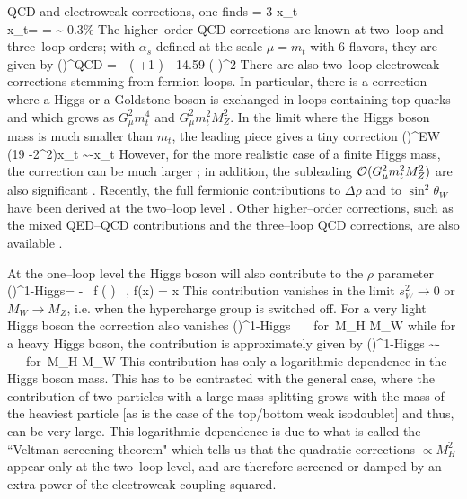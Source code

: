 QCD and electroweak corrections, one finds   
\beq 
\Delta \rho = 3 x_t  \label{deltarho} \\
x_t=  =  \sim 
0.3\%
\label{define:xt} 
\eeq
The higher--order QCD corrections are known at two--loop \cite{rho-2loopQCD}
and three--loop \cite{rho-3loopQCD} orders; with $\alpha_s$ defined at the 
scale $\mu = m_t$ with 6 flavors, they are given by
\beq
(\Delta \rho)^{\rm QCD} = -   \left( 
+1 \right) - 14.59 \left(  \right)^2 
\eeq
There are also two--loop electroweak corrections stemming from  fermion loops.
In particular, there is a correction where a Higgs or a Goldstone boson is
exchanged in loops containing top quarks and which grows as  $G_\mu^2 m_t^4$ and
$G_\mu^2 m_t^2 M_Z^2$. In the limit where the Higgs boson mass is much smaller
than $m_t$, the leading piece gives a tiny correction \cite{rho-2loopEW1} 
\beq
(\Delta \rho)^{\rm EW} \simeq (19 -2\pi^2)x_t \sim -x_t 
\eeq 
However, for the more realistic case of a finite Higgs mass, the correction 
can be much larger \cite{rho-2loopEW2}; in addition, the subleading ${\cal O} 
(G_\mu^2 m_t^2 M_Z^2)$ are also significant \cite{rho-2loopEW3,Paolo-approach}. 
Recently, the full fermionic contributions to $\Delta \rho$ and to $\sin^2
\theta_W$ have been derived at the two--loop level \cite{Awramicketal}. Other
higher--order corrections, such as the mixed QED--QCD contributions and the 
three--loop QCD corrections, are also available \cite{Mixed-QEDQCD}.   \s

At the one--loop level the Higgs boson will also contribute to the $\rho$ 
parameter \cite{rho-Veltman}
\beq
(\Delta \rho)^{\rm 1-Higgs}= - 
\, f \bigg(  \bigg) \ , \quad  
f(x) = x 
\eeq
This contribution vanishes in the limit $s_W^2 \to 0$ or  $M_W \to M_Z$, i.e. 
when the hypercharge group is switched off. For a very light Higgs boson
the correction also vanishes 
\beq
(\Delta \rho)^{\rm 1-Higgs}  \  \ \ {\rm for}~M_H \ll M_W
\eeq
while for a heavy Higgs boson, the contribution is approximately given by
\beq
(\Delta \rho)^{\rm 1-Higgs} \sim -   \, \,   \log {}  \ \ \ 
{\rm for}~M_H \gg M_W
\eeq
This contribution has only a logarithmic dependence in the  Higgs boson mass.
This has to be contrasted with the general case, where the  contribution of two
particles with a large mass splitting grows with the mass of the heaviest
particle [as is the case of the  top/bottom  weak isodoublet] and thus, can be
very large.   This logarithmic dependence is due to what is called the
``Veltman screening theorem" \cite{rho-Veltman,Screening-others} which tells 
us that the quadratic corrections $\propto M_H^2$ appear only at the two--loop 
level, and are therefore screened or damped by an extra power of the  
electroweak coupling squared. \s

